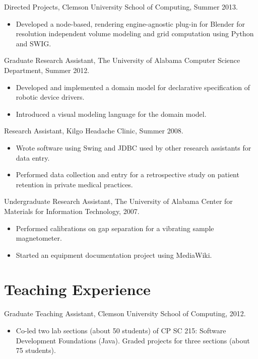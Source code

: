 \documentclass[12pt,oldfontcommands]{memoir}
\begin{document}
Directed Projects, Clemson University School of Computing, Summer 2013.

\begin{itemize}
  \item Developed a node-based, rendering engine-agnostic plug-in for Blender
        for resolution independent volume modeling and grid computation using
        Python and SWIG.
\end{itemize}

Graduate Research Assistant, The University of Alabama Computer Science
Department, Summer 2012.

\begin{itemize}
  \item Developed and implemented a domain model for declarative specification
        of robotic device drivers.
  \item Introduced a visual modeling language for the domain model.
\end{itemize}

Research Assistant, Kilgo Headache Clinic, Summer 2008.

\begin{itemize}
  \item Wrote software using Swing and JDBC used by other research assistants
        for data entry.
  \item Performed data collection and entry for a retrospective study on
        patient retention in private medical practices.
\end{itemize}

Undergraduate Research Assistant, The University of Alabama Center for
Materials for Information Technology, 2007.

\begin{itemize}
  \item Performed calibrations on gap separation for a vibrating sample
        magnetometer.
  \item Started an equipment documentation project using MediaWiki.
\end{itemize}

\section*{Teaching Experience}

Graduate Teaching Assistant, Clemson University School of Computing, 2012.

\begin{itemize}
  \item Co-led two lab sections (about 50 students) of CP SC 215: Software
        Development Foundations (Java). Graded projects for three sections (about 75
        students).
\end{itemize}
\end{document}
